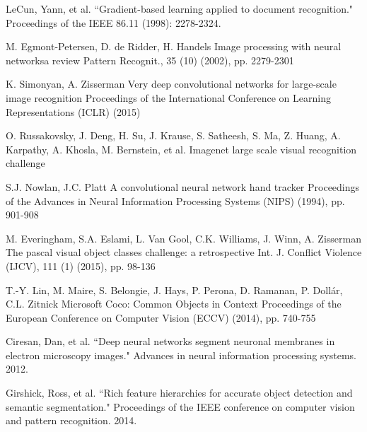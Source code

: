\documentclass[12pt]{report}
\begin{document}
\pagebreak
\begingroup
\makeatletter
\def\@makeschapterhead#1{%
  {\parindent \z@ \raggedright
    \normalfont
    \interlinepenalty\@M
    \Huge \bfseries  #1\par\nobreak
    \vskip 40\p@
  }}
\makeatother
\begin{thebibliography}{}

LeCun, Yann, et al. ``Gradient-based learning applied to document recognition." Proceedings of the IEEE 86.11 (1998): 2278-2324.

M. Egmont-Petersen, D. de Ridder, H. Handels
Image processing with neural networksa review
Pattern Recognit., 35 (10) (2002), pp. 2279-2301

K. Simonyan, A. Zisserman
Very deep convolutional networks for large-scale image recognition
Proceedings of the International Conference on Learning Representations (ICLR) (2015)

O. Russakovsky, J. Deng, H. Su, J. Krause, S. Satheesh, S. Ma, Z. Huang, A. Karpathy, A. Khosla, M. Bernstein, et al.
Imagenet large scale visual recognition challenge

S.J. Nowlan, J.C. Platt
A convolutional neural network hand tracker
Proceedings of the Advances in Neural Information Processing Systems (NIPS) (1994), pp. 901-908

M. Everingham, S.A. Eslami, L. Van Gool, C.K. Williams, J. Winn, A. Zisserman
The pascal visual object classes challenge: a retrospective
Int. J. Conflict Violence (IJCV), 111 (1) (2015), pp. 98-136

T.-Y. Lin, M. Maire, S. Belongie, J. Hays, P. Perona, D. Ramanan, P. Dollár, C.L. Zitnick
Microsoft Coco: Common Objects in Context
Proceedings of the European Conference on Computer Vision (ECCV) (2014), pp. 740-755

Ciresan, Dan, et al. ``Deep neural networks segment neuronal membranes in electron microscopy images." Advances in neural information processing systems. 2012.

Girshick, Ross, et al. ``Rich feature hierarchies for accurate object detection and semantic segmentation." Proceedings of the IEEE conference on computer vision and pattern recognition. 2014.



\end{thebibliography}
\end{document}
